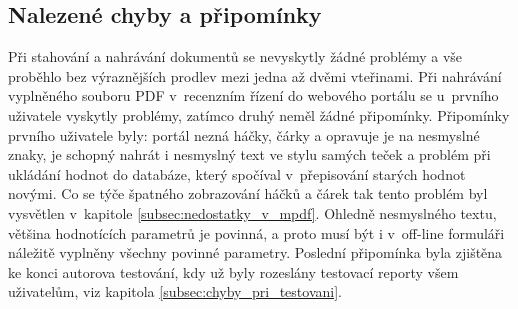 \subsection{Nalezené chyby a připomínky}
Při stahování a nahrávání dokumentů se nevyskytly žádné problémy a vše proběhlo bez výraznějších prodlev mezi jedna až dvěmi vteřinami. Při nahrávání vyplněného souboru PDF v~recenzním řízení do webového portálu se u~prvního uživatele vyskytly problémy, zatímco druhý neměl žádné připomínky. Připomínky prvního uživatele byly: portál nezná háčky, čárky a opravuje je na nesmyslné znaky, je schopný nahrát i nesmyslný text ve stylu samých teček a problém při ukládání hodnot do databáze, který spočíval v~přepisování starých hodnot novými. Co se týče špatného zobrazování háčků a čárek tak tento problém byl vysvětlen v~kapitole \ref{subsec:nedostatky_v_mpdf}. Ohledně nesmyslného textu, většina hodnotících parametrů je povinná, a proto musí být i v~off-line formuláři náležitě vyplněny všechny povinné parametry. Poslední připomínka byla zjištěna ke konci autorova testování, kdy už byly rozeslány testovací reporty všem uživatelům, viz kapitola \ref{subsec:chyby_pri_testovani}.  

 